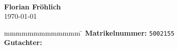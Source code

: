 \begin{titlepage}
\begin{center}
		\vspace*{12mm}	\langvon\\
		\vspace*{3mm}		{\large\textbf{Florian Fröhlich}}\\
		\vspace*{12mm}	\today\\
	\end{center}
	\vfill
	\begin{spacing}{1.2}
	\begin{tabbing}
		mmmmmmmmmmmmm             \= \kill
		\textbf{Matrikelnummer:}  \>  \texttt{5002155}\\
		\textbf{Gutachter:}              \>  \gutachter
	\end{tabbing}
	\end{spacing}
\end{titlepage}
